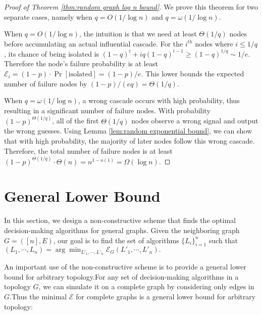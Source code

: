 \documentclass[a4paper,UKenglish]{lipics}
\theoremstyle{definition}
\begin{document}
\begin{proof}[Proof of Theorem \ref{thm:random graph log n bound}]

We prove this theorem for two separate cases, namely when $q = O(1 / \log n)$ and $q = \omega(1 / \log n)$. 

When $q = O(1 / \log n)$, the intuition is that we need at least $\Theta(1/q)$ nodes before accumulating an actual influential cascade.
For the $i^{th}$ nodes where $i \le 1/q$, its chance of being isolated is 
$
	(1 - q)^{i} + iq(1-q)^{i-1}
\ge
	(1 - q)^{1 / q}
\sim
	{1 / e}.
$
Therefore the node's failure probability is at least $\mathcal{E}_i = (1-p)\cdot\Pr[\text{isolated}] = (1-p)/e$.
This lower bounds the expected number of failure nodes by $(1-p)/(eq) = \Theta(1/q)$.

When $q = \omega(1 / \log n)$, 
	a wrong cascade occurs with high probability,
	thus resulting in a significant number of failure nodes.
With probability $(1-p)^{\Theta(1/q)}$, all of the first $\Theta(1/q)$ nodes observe a wrong signal and output the wrong guesses.
Using Lemma \ref{lem:random exponential bound}, we can show that with high probability, the majority of later nodes follow this wrong cascade.
Therefore, the total number of failure nodes is at least
$
(1-p)^{\Theta(1/q)}\cdot \Theta(n) = n^{1 - o(1)} = \Omega(\log n).
$
\end{proof}









\section{General Lower Bound}
In this section, we design a non-constructive scheme that finds the optimal decision-making algorithms for general graphs.
Given the neighboring graph $G = ([n], E)$, our goal is to find the set of algorithms $\{L_i\}_{i=1}^{n}$ such that
$
	(L_1, \dotsb, L_n)
=
	\arg\min_{L'_1, \dotsb, L'_n} \mathcal{E}_{G}(L'_1,\dotsb, L'_n).
$

An important use of the non-constructive scheme is to provide a general lower bound for arbitrary topology.For any set of decision-making algorithms in a topology $G$, we can simulate it on a complete graph by considering only edges in $G$.Thus the minimal $\mathcal{E}$ for complete graphs is a general lower bound for arbitrary topology:
\end{document}
